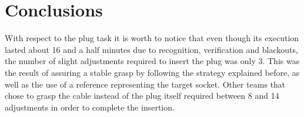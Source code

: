 \section{Conclusions}
	\label{sec:conclusions}
	
	With respect to the plug task it is worth to notice that even though its execution
	lasted about 16 and a half minutes due to recognition, verification and blackouts,
	the number of slight adjustments required to insert the plug was only 3.
	This was the result of assuring a stable grasp by following the strategy explained
	before, as well as the use of a reference representing the target socket.
	Other teams that chose to grasp the cable instead of the plug itself required between
	8 and 14 adjustments in order to complete the insertion.